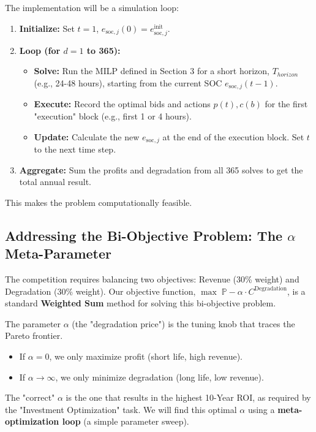 \documentclass[11pt, a4paper]{article}
\begin{document}
The implementation will be a simulation loop:
\begin{enumerate}
    \item \textbf{Initialize:} Set $t=1$, $e_{\mathrm{soc},j}(0) = e^{\mathrm{init}}_{\mathrm{soc},j}$.
    \item \textbf{Loop (for $d = 1$ to 365):}
    \begin{itemize}
        \item \textbf{Solve:} Run the MILP defined in Section 3 for a short horizon, $T_{horizon}$ (e.g., 24-48 hours), starting from the current SOC $e_{\mathrm{soc},j}(t-1)$.
        \item \textbf{Execute:} Record the optimal bids and actions $p(t), c(b)$ for the first "execution" block (e.g., first 1 or 4 hours).
        \item \textbf{Update:} Calculate the new $e_{\mathrm{soc},j}$ at the end of the execution block. Set $t$ to the next time step.
    \end{itemize}
    \item \textbf{Aggregate:} Sum the profits and degradation from all 365 solves to get the total annual result.
\end{enumerate}
This makes the problem computationally feasible.

\subsection{Addressing the Bi-Objective Problem: The $\alpha$ Meta-Parameter}
The competition requires balancing two objectives: Revenue (30\% weight) and Degradation (30\% weight). Our objective function, $\max \; \mathbb{P} - \alpha \cdot C^{\mathrm{Degradation}}$, is a standard \textbf{Weighted Sum} method for solving this bi-objective problem.

The parameter $\alpha$ (the "degradation price") is the tuning knob that traces the Pareto frontier.
\begin{itemize}
    \item If $\alpha=0$, we only maximize profit (short life, high revenue).
    \item If $\alpha \to \infty$, we only minimize degradation (long life, low revenue).
\end{itemize}
The "correct" $\alpha$ is the one that results in the highest 10-Year ROI, as required by the "Investment Optimization" task. We will find this optimal $\alpha$ using a \textbf{meta-optimization loop} (a simple parameter sweep).
\end{document}
